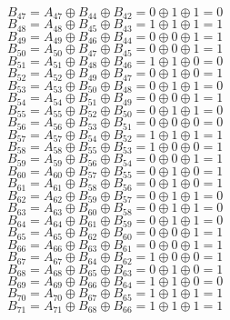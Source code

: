 $B_{47}=A_{47}\oplus B_{44}\oplus B_{42}=0\oplus 1\oplus 1=0$\\
$B_{48}=A_{48}\oplus B_{45}\oplus B_{43}=1\oplus 1\oplus 1=1$\\
$B_{49}=A_{49}\oplus B_{46}\oplus B_{44}=0\oplus 0\oplus 1=1$\\
$B_{50}=A_{50}\oplus B_{47}\oplus B_{45}=0\oplus 0\oplus 1=1$\\
$B_{51}=A_{51}\oplus B_{48}\oplus B_{46}=1\oplus 1\oplus 0=0$\\
$B_{52}=A_{52}\oplus B_{49}\oplus B_{47}=0\oplus 1\oplus 0=1$\\
$B_{53}=A_{53}\oplus B_{50}\oplus B_{48}=0\oplus 1\oplus 1=0$\\
$B_{54}=A_{54}\oplus B_{51}\oplus B_{49}=0\oplus 0\oplus 1=1$\\
$B_{55}=A_{55}\oplus B_{52}\oplus B_{50}=0\oplus 1\oplus 1=0$\\
$B_{56}=A_{56}\oplus B_{53}\oplus B_{51}=0\oplus 0\oplus 0=0$\\
$B_{57}=A_{57}\oplus B_{54}\oplus B_{52}=1\oplus 1\oplus 1=1$\\
$B_{58}=A_{58}\oplus B_{55}\oplus B_{53}=1\oplus 0\oplus 0=1$\\
$B_{59}=A_{59}\oplus B_{56}\oplus B_{54}=0\oplus 0\oplus 1=1$\\
$B_{60}=A_{60}\oplus B_{57}\oplus B_{55}=0\oplus 1\oplus 0=1$\\
$B_{61}=A_{61}\oplus B_{58}\oplus B_{56}=0\oplus 1\oplus 0=1$\\
$B_{62}=A_{62}\oplus B_{59}\oplus B_{57}=0\oplus 1\oplus 1=0$\\
$B_{63}=A_{63}\oplus B_{60}\oplus B_{58}=0\oplus 1\oplus 1=0$\\
$B_{64}=A_{64}\oplus B_{61}\oplus B_{59}=0\oplus 1\oplus 1=0$\\
$B_{65}=A_{65}\oplus B_{62}\oplus B_{60}=0\oplus 0\oplus 1=1$\\
$B_{66}=A_{66}\oplus B_{63}\oplus B_{61}=0\oplus 0\oplus 1=1$\\
$B_{67}=A_{67}\oplus B_{64}\oplus B_{62}=1\oplus 0\oplus 0=1$\\
$B_{68}=A_{68}\oplus B_{65}\oplus B_{63}=0\oplus 1\oplus 0=1$\\
$B_{69}=A_{69}\oplus B_{66}\oplus B_{64}=1\oplus 1\oplus 0=0$\\
$B_{70}=A_{70}\oplus B_{67}\oplus B_{65}=1\oplus 1\oplus 1=1$\\
$B_{71}=A_{71}\oplus B_{68}\oplus B_{66}=1\oplus 1\oplus 1=1$\\
